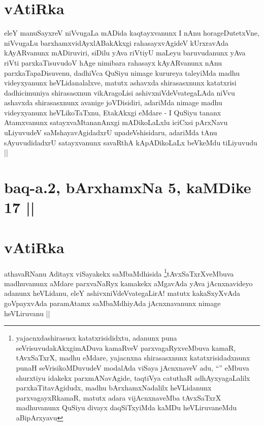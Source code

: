 
\stext

\section*{vAtiRka}

\begin{artha}
eleY manuSayxreV niVvugaLa mADida kaqtayxvanunx I nAnu
horageDutetxVne, niVvugaLu barxhamxvidAyxlABakAkxgi rahasayxvAgideV
kUrxravAda kAyARvanunx mADiruviri, siDilu yAva riVtiyU maLeyu
baruvudanunx yAva riVti parxkaTisuvudoV hAge nimibara rahasayx
kAyARvanunx nAnu parxkaTapaDisuvenu, dadhiVca QuSiyu nimage kurureya
taleyiMda madhu videyxyanunx heVLidanalalxve, matutx ashavxda
shirasasxnunx katatxrisi dadhicimuniya shirasasxnun vikAragoLisi
ashivxniVdeVvategaLAda niVvu ashavxda shirasasxnunx avanige
joVDisidiri, adariMda nimage madhu videyxyanunx heVLikoTaTxnu,
EtakAkxgi eMdare - I QuSiyu tananx Atamxvanunx satayxvaMtananAnxgi
mADikoLaLxlu iciCxsi pArxNavu uLiyuvudeV saMshayavAgidadxrU
upadeVshisidaru, adariMda tAnu sAyuvudidadxrU satayxvanunx savaRthA
kApADikoLaLx beVkeMdu tiLiyuvudu ||
\end{artha}

\section*{baq-a.2, bArxhamxNa 5, kaMDike 17 ||}

\stext

\section*{vAtiRka}

\begin{artha}
athavaRNanu Aditayx viSayakekx
saMbaMdhisida \footnote[1]{yajacnxdashirasusx katatxrisididxtu,
  adanunx puna seVrisuvudakAkxgimADuva kamaRveV parxvagaRyxveMbuva
  kamaR, tAvxSaTxrX, madhu eMdare, yajacnxna shirasasxnunx
  katatxrisidadxnunx punaH seVrisikoMDuvudeV modalAda viSaya
  jAcnxnaveV adu, ``\stext'' eMbuva shurxtiyu idakekx parxmANavAgide,
  taqtiVya catuthaR adhAyxyagaLalilx parxkaTitavAgidudx, madhu
  bArxhamxNadalilx heVLidanunx parxvagayxRkamaR, matutx adara
  vijAcnxnaveMba tAvxSaTxrX madhuvanunx QuSiyu divayx daqSiTxyiMda
  kaMDu heVLiruvaneMdu aBipArxyavu}tAvxSaTxrXveMbuva madhuvanunx aMdare
parxvaNaRyx kamakekx aMgavAda yAva jAcnxnavideyo adanunx heVLidanu,
eleY ashivxniVdeVvategaLirA! matutx kakaSxyXvAda goVpayxvAda
paramAtamx saMbaMdhiyAda jAcnxnavanunx nimage heVLiruvanu ||
\end{artha}

